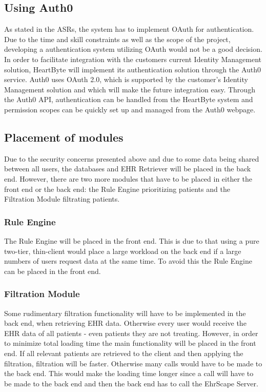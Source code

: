 \documentclass{article}
\begin{document}
\subsection{Using Auth0}
As stated in the ASRs, the system has to implement OAuth for authentication. Due to the time and skill constraints as well as the scope of the project, developing a authentication system utilizing OAuth would not be a good decision. In order to facilitate integration with the customers current Identity Management solution, HeartByte will implement its authentication solution through the Auth0 service. Auth0 uses OAuth 2.0, which is supported by the customer's Identity Management solution and which will make the future integration easy. Through the Auth0 API, authentication can be handled from the HeartByte system and permission scopes can be quickly set up and managed from the Auth0 webpage.

\subsection{Placement of modules}\label{placement-modules}
Due to the security concerns presented above and due to some data being shared between all users, the databases and EHR Retriever will be placed in the back end. However, there are two more modules that have to be placed in either the front end or the back end: the Rule Engine prioritizing patients and the Filtration Module filtrating patients.

\subsubsection{Rule Engine}
The Rule Engine will be placed in the front end. This is due to that using a pure two-tier, thin-client would place a large workload on the back end if a large numbers of users request data at the same time. To avoid this the Rule Engine can be placed in the front end. 

\subsubsection{Filtration Module}
Some rudimentary filtration functionality will have to be implemented in the back end, when retrieving EHR data. Otherwise every user would receive the EHR data of all patients - even patients they are not treating. However, in order to minimize total loading time the main functionality will be placed in the front end. If all relevant patients are retrieved to the client and then applying the filtration, filtration will be faster. Otherwise many calls would have to be made to the back end. This would make the loading time longer since a call will have to be made to the back end and then the back end has to call the EhrScape Server.
\end{document}
